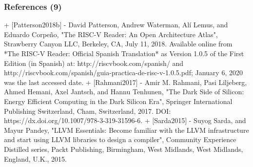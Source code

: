 \begin{frame}
	\frametitle{References (9)}


+ $[$Patterson2018b$]$
	- David Patterson, Andrew Waterman, Al{\'{i}} Lemus, and Eduardo Corpe{\~{n}}o, "The {RISC-V} Reader: An Open Architecture Atlas", Strawberry Canyon {LLC}, Berkeley, {CA}, July 11, 2018. Available online from *The {RISC-V} Reader: Official Spanish Translation* as Version 1.0.5 of the First Edition (in Spanish) at: http://riscvbook.com/spanish/ and http://riscvbook.com/spanish/guia-practica-de-risc-v-1.0.5.pdf; January 6, 2020 was the last accessed date.
+ $[$Rahmani2017$]$
	- Amir M. Rahmani, Pasi Liljeberg, Ahmed Hemani, Axel Jantsch, and Hannu Tenhunen, "The Dark Side of Silicon: Energy Efficient Computing in the Dark Silicon Era", Springer International Publishing Switzerland, Cham, Switzerland, 2017. DOI: https://dx.doi.org/10.1007/978-3-319-31596-6.
+ $[$Sarda2015$]$
	- Suyog Sarda, and Mayur Pandey, "{LLVM} Essentials: Become familiar with the {LLVM} infrastructure and start using {LLVM} libraries to design a compiler", Community Experience Distilled series, Packt Publishing, Birmingham, West Midlands, West Midlands, England, {U.K.}, 2015.



\end{frame}




















